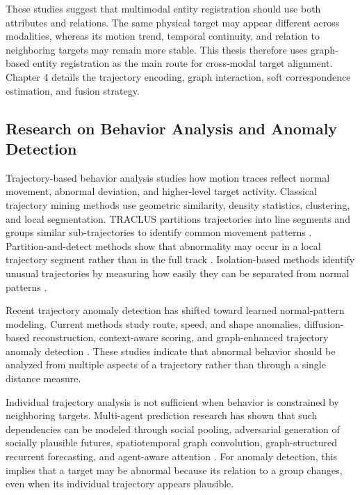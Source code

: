 These studies suggest that multimodal entity registration should use both attributes and relations. The same physical target may appear different across modalities, whereas its motion trend, temporal continuity, and relation to neighboring targets may remain more stable. This thesis therefore uses graph-based entity registration as the main route for cross-modal target alignment. Chapter 4 details the trajectory encoding, graph interaction, soft correspondence estimation, and fusion strategy.

\subsection{Research on Behavior Analysis and Anomaly Detection}
Trajectory-based behavior analysis studies how motion traces reflect normal movement, abnormal deviation, and higher-level target activity. Classical trajectory mining methods use geometric similarity, density statistics, clustering, and local segmentation. TRACLUS partitions trajectories into line segments and groups similar sub-trajectories to identify common movement patterns \cite{lee2007traclus}. Partition-and-detect methods show that abnormality may occur in a local trajectory segment rather than in the full track \cite{lee2008traod}. Isolation-based methods identify unusual trajectories by measuring how easily they can be separated from normal patterns \cite{zhang2011ibat}.

Recent trajectory anomaly detection has shifted toward learned normal-pattern modeling. Current methods study route, speed, and shape anomalies, diffusion-based reconstruction, context-aware scoring, and graph-enhanced trajectory anomaly detection \cite{cao2025cetrajectory,li2024difftad,hu2024contexttrajad,mbuya2025getad}. These studies indicate that abnormal behavior should be analyzed from multiple aspects of a trajectory rather than through a single distance measure.

Individual trajectory analysis is not sufficient when behavior is constrained by neighboring targets. Multi-agent prediction research has shown that such dependencies can be modeled through social pooling, adversarial generation of socially plausible futures, spatiotemporal graph convolution, graph-structured recurrent forecasting, and agent-aware attention \cite{alahi2016sociallstm,gupta2018socialgan,mohamed2020socialstgcnn,salzmann2020trajectronpp,yuan2021agentformer}. For anomaly detection, this implies that a target may be abnormal because its relation to a group changes, even when its individual trajectory appears plausible.


